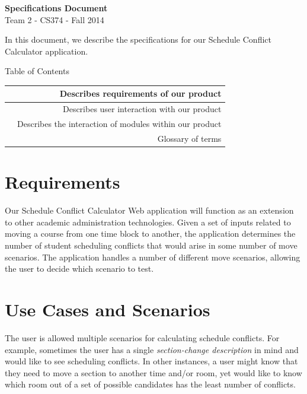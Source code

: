 \documentclass[11pt]{article}
\begin{document}
\begin{center}
\LARGE{\textbf{Specifications Document}}\\
\normalsize{Team 2 - CS374 - Fall 2014}
\end{center}
\vspace{.1in}

In this document, we describe the specifications for our Schedule Conflict Calculator application.
\vspace{.2in}

\LARGE Table of Contents \\

\normalsize
\begin{tabular}{| l || r |}
  \hline
  \nameref{sec:reqs} & Describes requirements of our product \\ \hline
  \nameref{sec:scenes} & Describes user interaction with our product \\ \hline
  \nameref{sec:dataflow} & Describes the interaction of modules within our product \\ \hline
  \nameref{sec:glossary} & Glossary of terms \\
  \hline
\end{tabular}

\pagebreak[4]

\section{Requirements} \label{sec:reqs}

Our Schedule Conflict Calculator Web application will function as an extension to other academic administration technologies. Given
a set of inputs related to moving a course from one time block to another, the application determines the number of student
scheduling conflicts that would arise in some number of move scenarios. The application handles a number of different move
scenarios, allowing the user to decide which scenario to test.

\pagebreak[4]

\section{Use Cases and Scenarios} \label{sec:scenes}

The user is allowed multiple scenarios for calculating schedule conflicts. For example, sometimes the user has a single
\textit{section-change description} in mind and would like to see scheduling conflicts. In other instances, a user might
know that they need to move a section to another time and/or room, yet would like to know which room out of a set of possible
candidates has the least number of conflicts.
\vspace{.2in}
\end{document}
